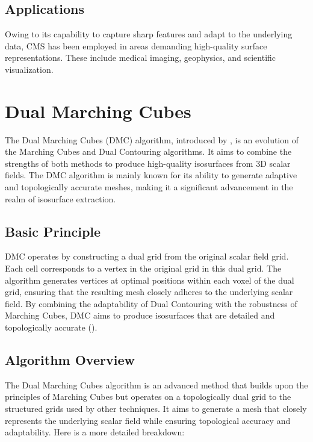 \subsection{Applications}

Owing to its capability to capture sharp features and adapt to the underlying data, CMS has been employed in areas demanding high-quality surface representations. These include medical imaging, geophysics, and scientific visualization.


\section{Dual Marching Cubes} \label{Dual-Marching-Cubes}

The Dual Marching Cubes (DMC) algorithm, introduced by \cite{Nielson_2004}, is an evolution of the Marching Cubes and Dual Contouring algorithms. It aims to combine the strengths of both methods to produce high-quality isosurfaces from 3D scalar fields. The DMC algorithm is mainly known for its ability to generate adaptive and topologically accurate meshes, making it a significant advancement in the realm of isosurface extraction.

\vspace{2mm}
\subsection{Basic Principle}

DMC operates by constructing a dual grid from the original scalar field grid. Each cell corresponds to a vertex in the original grid in this dual grid. The algorithm generates vertices at optimal positions within each voxel of the dual grid, ensuring that the resulting mesh closely adheres to the underlying scalar field. By combining the adaptability of Dual Contouring with the robustness of Marching Cubes, DMC aims to produce isosurfaces that are detailed and topologically accurate (\cite{Schaefer_2004}).

\vspace{2mm}
\subsection{Algorithm Overview}

The Dual Marching Cubes algorithm is an advanced method that builds upon the principles of Marching Cubes but operates on a topologically dual grid to the structured grids used by other techniques. It aims to generate a mesh that closely represents the underlying scalar field while ensuring topological accuracy and adaptability. Here is a more detailed breakdown:

